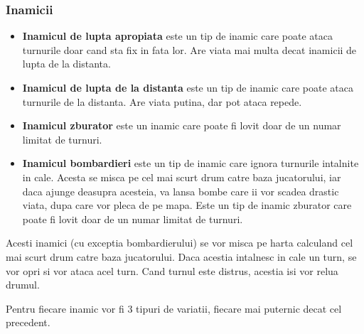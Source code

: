 \documentclass[12pt, a4paper]{article}
\begin{document}
	
	
	\subsubsection{Inamicii}
	\begin{itemize}
		\item \textbf{Inamicul de lupta apropiata} este un tip de inamic care poate ataca turnurile doar cand sta fix in fata lor. Are viata mai multa decat inamicii de lupta de la distanta.
		\item \textbf{Inamicul de lupta de la distanta} este un tip de inamic care poate ataca turnurile de la distanta. Are viata putina, dar pot ataca repede.
		\item \textbf{Inamicul zburator} este un inamic care poate fi lovit doar de un numar limitat de turnuri.
		\item \textbf{Inamicul bombardieri} este un tip de inamic care ignora turnurile intalnite in cale. Acesta se misca pe cel mai scurt drum catre baza jucatorului, iar daca ajunge deasupra acesteia, va lansa bombe care ii vor scadea drastic viata, dupa care vor pleca de pe mapa. Este un tip de inamic zburator care poate fi lovit doar de un numar limitat de turnuri.
	\end{itemize}

	Acesti inamici (cu exceptia bombardierului) se vor misca pe harta calculand cel mai scurt drum catre baza jucatorului. Daca acestia intalnesc in cale un turn, se vor opri si vor ataca acel turn. Cand turnul este distrus, acestia isi vor relua drumul.
	
	Pentru fiecare inamic vor fi 3 tipuri de variatii, fiecare mai puternic decat cel precedent.
	
	
	
\end{document}
